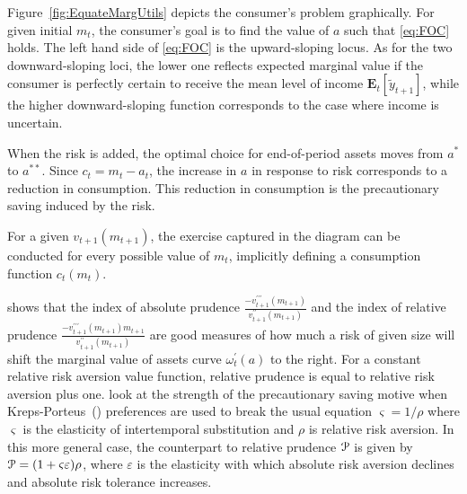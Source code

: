 Figure~\ref{fig:EquateMargUtils} depicts the consumer's problem
graphically.  For given initial ${m}_{t}$, the consumer's goal is to
find the value of $a$ such that \eqref{eq:FOC} holds.  The left hand
side of \eqref{eq:FOC} is the upward-sloping locus.  As for the two
downward-sloping loci, the lower one reflects expected marginal value
if the consumer is perfectly certain to receive the mean level of
income $\mathbf{E}_{t}[\tilde{y}_{t+1}]$, while the higher downward-sloping
function corresponds to the case where income is uncertain.

When the risk is added, the optimal choice for end-of-period assets
moves from ${a}^{*}$ to ${a}^{**}$. Since $c_{t} = m_{t}-a_{t}$, the
increase in $a$ in response to risk corresponds to a reduction in
consumption. This reduction in consumption is the precautionary saving
induced by the risk.

For a given ${v}_{t+1}({m}_{t+1})$, the exercise captured in the
diagram can be conducted for every possible value of $m_{t}$,
implicitly defining a consumption function $c_{t}(m_{t})$.

\cite{kimball:smallandlarge} shows that the index of absolute prudence
$\frac{-{v}^{\prime\prime\prime}_{t+1}(m_{t+1})}{{v}^{\prime\prime}_{t+1}(m_{t+1})}$
and the index of relative prudence
$\frac{-{v}^{\prime\prime\prime}_{t+1}(m_{t+1})
  m_{t+1}}{{v}^{\prime\prime}_{t+1}(m_{t+1})}$ are good measures of
how much a risk of given size will shift the marginal value of assets
curve $\omega_{t}^{\prime}(a)$ to the right.  For a constant relative
risk aversion value function, relative prudence is equal to relative
risk aversion plus one.  \cite{KimballWeil:Poss} look at the strength
of the precautionary saving motive when
Kreps-Porteus~(\citeyear{KrepsPorteus:Prefs}) preferences are used to
break the usual equation $\varsigma = 1/\rho$ where $\varsigma$ is the
elasticity of intertemporal substitution and $\rho$ is relative risk
aversion.  In this more general case, the counterpart to relative
prudence ${\cal P}$ is given by ${\cal P} = (1 + \varsigma
\varepsilon) \rho$, where $\varepsilon$ is the elasticity with which
absolute risk aversion declines and absolute risk tolerance increases.

